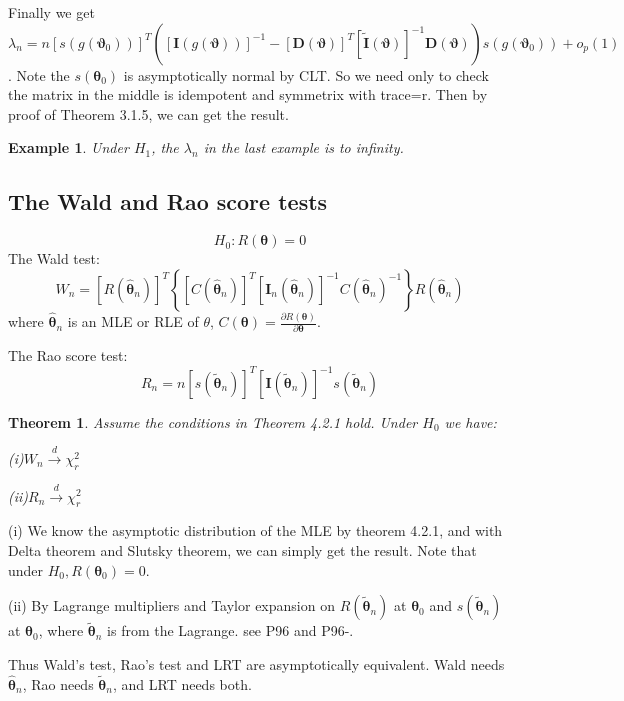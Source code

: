 \documentclass{ctexart}
\newtheorem{theorem}{Theorem}[subsection]
\newtheorem{example}{Example}[subsection]
\begin{document}
Finally we get \(\lambda_{n}=n[s(g(\boldsymbol{\vartheta}_{0}))]^{T}([\boldsymbol{I}(g(\boldsymbol{\vartheta}))]^{-1}-[\boldsymbol{D}(\boldsymbol{\vartheta})]^{T}[\tilde{\boldsymbol{I}}(\boldsymbol{\vartheta})]^{-1}\boldsymbol{D}(\boldsymbol{\vartheta}))s(g(\boldsymbol{\vartheta}_{0}))+o_{p}(1)\). Note the \(s(\boldsymbol{\theta}_{0})\)
 is asymptotically normal by CLT. So we need only to check the matrix in the middle is idempotent and symmetrix with trace=r. Then by proof of Theorem 3.1.5, we can get the result. 
\begin{example}
  Under \(H_{1}\), the \(\lambda_{n}\) in the last example is to infinity.   
\end{example}  
\subsection{The Wald and Rao score tests}
\[
H_{0}:R(\boldsymbol{\theta})=0
\] 
The Wald test: 
\[
W_{n}=[R(\hat{\boldsymbol{\theta}}_{n})]^{T}\left\{ [C(\hat{\boldsymbol{\theta}}_{n})]^{T}[\boldsymbol{I}_{n}(\hat{\boldsymbol{\theta}}_{n})]^{-1}C(\hat{\boldsymbol{\theta}}_{n}) ^{-1}\right\}R(\hat{\boldsymbol{\theta}}_{n})
\] 
where \(\hat{\boldsymbol{\theta}}_{n}\) is an MLE or RLE of \(\theta  \), \(C(\boldsymbol{\theta})=\frac{\partial R(\boldsymbol{\theta})}{\partial \boldsymbol{\theta}} \).

The Rao score test: 
\[
R_{n}=n[s(\tilde{\boldsymbol{\theta}}_{n})]^{T}[\boldsymbol{I}(\tilde{\boldsymbol{\theta}}_{n})]^{-1}s(\tilde{\boldsymbol{\theta}}_{n})
\] 
\begin{theorem}
  Assume the conditions in Theorem 4.2.1 hold. Under \(H_{0}\) we have: 
  
  (i)\(W_{n}\xrightarrow{d}\chi_{r}^{2}\)

  (ii)\(R_{n}\xrightarrow{d}\chi_{r}^{2}\)  
\end{theorem}
(i) We know the asymptotic distribution of the MLE by theorem 4.2.1, and with Delta theorem and Slutsky theorem, we can simply get the result. Note that under \(H_{0},R(\boldsymbol{\theta}_{0})=0.\) 

(ii) By Lagrange multipliers and Taylor expansion on \(R(\tilde{\boldsymbol{\theta}}_{n})\) at \(\boldsymbol{\theta}_{0}\) and \(s(\tilde{\boldsymbol{\theta}}_{n})\) at \(\boldsymbol{\theta}_{0}\), where \(\tilde{\boldsymbol{\theta}}_{n}\) is from the Lagrange. see P96 and P96-.

Thus Wald's test, Rao's test and LRT are asymptotically equivalent. Wald needs \(\hat{\boldsymbol{\theta}}_{n}\), Rao needs \(\tilde{\boldsymbol{\theta}}_{n}\), and LRT needs both.   
\end{document}
